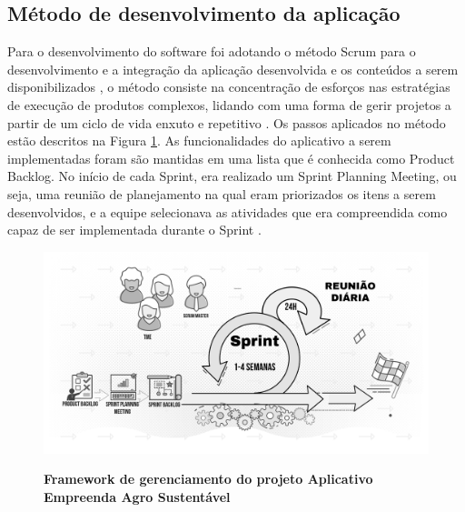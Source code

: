 \subsection{Método de desenvolvimento da aplicação}

Para o desenvolvimento do software foi adotando o método Scrum para o desenvolvimento e a integração da aplicação desenvolvida e os conteúdos a serem disponibilizados \cite{schreier_solar_2017},  o método consiste na concentração de esforços nas estratégias de execução de produtos complexos, lidando com uma forma de gerir projetos a partir de um ciclo de vida enxuto e repetitivo \cite{bernardo_framework_2019}. Os passos aplicados no método estão descritos na Figura \ref{figura_47}. 
As funcionalidades do aplicativo a serem implementadas foram são mantidas em uma lista que é conhecida como Product Backlog. No início de cada Sprint, era realizado um Sprint Planning Meeting, ou seja, uma reunião de planejamento na qual eram priorizados os itens a serem desenvolvidos, e a equipe selecionava as atividades que era compreendida como capaz de ser implementada durante o Sprint \cite{trainning_education_services_curso_2018}.


\begin{figure}[H]
\centering
\caption{\textbf{Framework de gerenciamento do projeto Aplicativo Empreenda Agro Sustentável }}
\includegraphics[scale=0.1]{Imagens/scrum.png}
\label{figura_47}
\end{figure}

